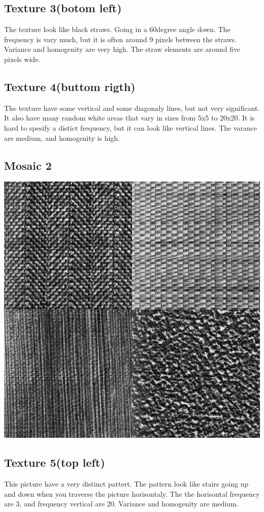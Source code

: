 \documentclass{article}
\begin{document}
\subsection{Texture 3(botom left)}
The texture look like black straws. Going in a 60degree angle down. The frequency is vary much, but it is often around 9 pixels between the straws. Variance and homogenity are very high. The straw elements are around five pixels wide. 
\subsection{Texture 4(buttom rigth)}
The texture have some vertical and some diagonaly lines, but not very significant. It also have many random white areas that vary in sizes from 5x5 to 20x20. It is hard to spesify a distict frequency, but it can look like vertical lines. The varance are medium, and homogenity is high.
\subsection{Mosaic 2}
\includegraphics[totalheight=12cm]{mosaic2.png}
\subsection{Texture 5(top left)}
This picture have a very distinct pattert. The pattern look like stairs going up and down when you traverse the picture horisontaly. The the horisontal frequency are 3, and frequency vertical are 20. 
Variance and homogenity are medium. 
\end{document}

